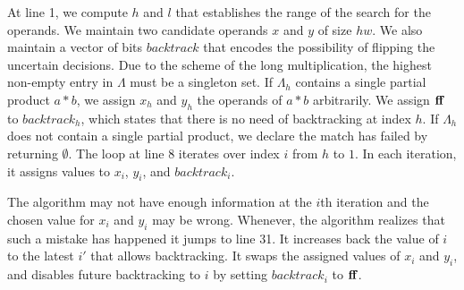 At line 1, we compute $h$ and $l$ that establishes the range of the
search for the operands.
%
We maintain two candidate operands $x$ and $y$ of size $hw$.
%
We also maintain a vector of bits $backtrack$ that encodes 
the possibility of flipping the uncertain decisions.
%
Due to the scheme of the long multiplication, the highest
non-empty entry in $\Lambda$ must be a singleton set.
%
If $\Lambda_h$ contains a single partial product $a*b$,
we assign $x_h$ and $y_h$ the operands of $a*b$ arbitrarily.
%
We assign $\mathbf{ff}$ to $backtrack_h$, which states that there is no need of backtracking at index $h$.
%
If $\Lambda_h$ does not contain a single partial product,
we declare the match has failed by returning $\emptyset$.
%
The loop at line 8 iterates over index $i$ from $h$ to $1$.
%
In each iteration, it assigns values to $x_i$, $y_i$, and $backtrack_i$. 
%

The algorithm may not have enough information at the $i$th iteration
and the chosen value for $x_i$ and $y_i$ may be wrong.
%
Whenever, the algorithm realizes that such a mistake has happened
it jumps to line 31.
%
It increases back the value of $i$ to the latest $i'$ that allows
backtracking.
%
It swaps the assigned values of $x_i$ and $y_i$, and disables future
backtracking to $i$ by setting $backtrack_i$ to
$\mathbf{ff}$.
%

